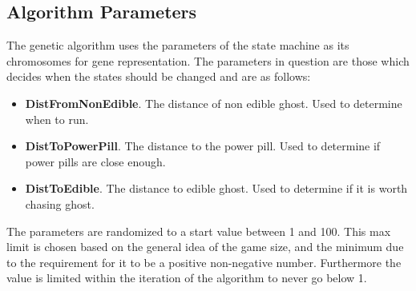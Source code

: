 \documentclass[conference,compsoc]{IEEEtran}
\begin{document}
\subsection{Algorithm Parameters}
The genetic algorithm uses the parameters of the state machine as its chromosomes for gene representation.
The parameters in question are those which decides when the states should be changed and are as follows:
\begin{itemize}
\item[]  \textbf{DistFromNonEdible}. The distance of non edible ghost. Used to determine when to run.
\item[] \textbf{DistToPowerPill}. The distance to the power pill. Used to determine if power pills are close enough.
\item[] \textbf{DistToEdible}. The distance to edible ghost. Used to determine if it is worth chasing ghost.
\end{itemize}

The parameters are randomized to a start value between 1 and 100. This max limit is chosen based on the general idea of the game size, and the minimum due to the requirement for it to be a positive non-negative number.
Furthermore the value is limited within the iteration of the algorithm to never go below 1.
\end{document}
